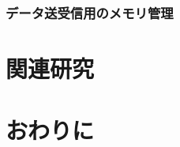 \documentclass[submit]{ipsj_v2/UTF8/ipsj}
\begin{document}
\subsubsection{データ送受信用のメモリ管理}



\section{関連研究}
\label{sec:RelatedWork}

\section{おわりに}
\label{sec:Conclusion}




\end{document}
